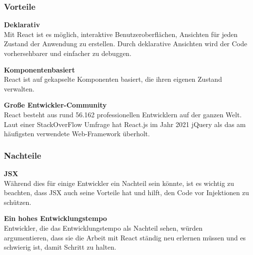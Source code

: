 
\subsubsection{Vorteile}
\textbf{Deklarativ} \\
Mit React ist es möglich, interaktive Benutzeroberflächen, Ansichten für jeden Zustand der Anwendung zu erstellen. %
Durch deklarative Ansichten wird der Code vorhersehbarer und einfacher zu debuggen.
\newline

\textbf{Komponentenbasiert}\\
React ist auf gekapselte Komponenten basiert, die ihren eigenen Zustand verwalten.
\newline

\textbf{Große Entwickler-Community}\\
React besteht aus rund 56.162 professionellen Entwicklern auf der ganzen Welt.
Laut einer StackOverFlow Umfrage hat React.js im Jahr 2021 jQuery als das am häufigsten verwendete Web-Framework überholt. {\cite{SO01}}
\newpage

\subsubsection{Nachteile}

\textbf{JSX}\\
Während dies für einige Entwickler ein Nachteil sein könnte, ist es wichtig zu beachten, dass JSX auch seine Vorteile hat und hilft, den Code vor Injektionen zu schützen.{\cite{R02}}
\newline

\textbf{Ein hohes Entwicklungstempo}\\
Entwickler, die das Entwicklungstempo als Nachteil sehen, würden argumentieren, dass sie die Arbeit mit React ständig neu erlernen müssen und es schwierig ist, damit Schritt zu halten.

